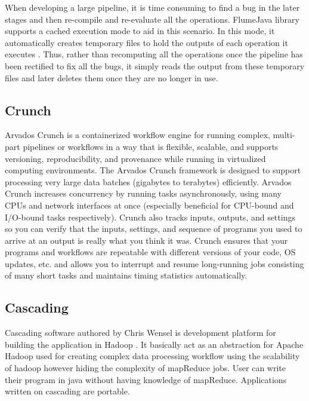     When developing a large pipeline, it is time consuming to find a
    bug in the later stages and then re-compile and re-evaluate all
    the operations. FlumeJava library supports a cached execution mode
    to aid in this scenario. In this mode, it automatically creates
    temporary files to hold the outputs of each operation it
    executes \cite{flumejava-paper}. Thus, rather than recomputing
    all the operations once the pipeline has been rectified to fix all
    the bugs, it simply reads the output from these temporary files
    and later deletes them once they are no longer in use.    

\pv

\subsection{Crunch}

    Arvados Crunch \cite{www-arvados} is a containerized workflow
    engine for running complex, multi-part pipelines or workflows in a
    way that is flexible, scalable, and supports versioning,
    reproducibility, and provenance while running in virtualized
    computing environments. The Arvados Crunch \cite{www-crunch}
    framework is designed to support processing very large data
    batches (gigabytes to terabytes) efficiently. Arvados Crunch
    increases concurrency by running tasks asynchronously, using many
    CPUs and network interfaces at once (especially beneficial for
    CPU-bound and I/O-bound tasks respectively). Crunch also tracks
    inputs, outputs, and settings so you can verify that the inputs,
    settings, and sequence of programs you used to arrive at an output
    is really what you think it was. Crunch ensures that your programs
    and workflows are repeatable with different versions of your code,
    OS updates, etc. and allows you to interrupt and resume
    long-running jobs consisting of many short tasks and maintains
    timing statistics automatically.

    \pv

\subsection{Cascading}

    Cascading software authored by Chris Wensel
    is development platform for building the application in Hadoop \cite{www-cascading}.
    It basically act as an abstraction for Apache Hadoop used for
    creating complex data processing workflow using the scalability of
    hadoop however hiding the complexity of mapReduce jobs.  User can
    write their program in java without having knowledge of
    mapReduce. Applications written on cascading are portable.
 
